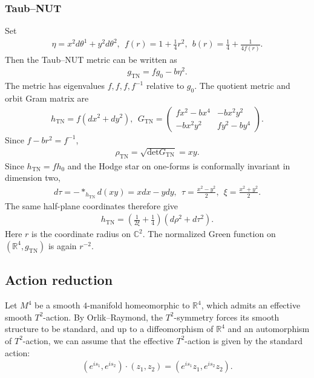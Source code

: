 \documentclass[letterpaper]{amsart}
\theoremstyle{definition}
\theoremstyle{remark}
\begin{document}
\subsubsection{Taub--NUT}
Set
\begin{align*}
	\eta = x ^2 d \theta ^{1} + y ^2 d \theta ^2,\ \ f(r)= 1+ \frac{1}{4}r ^2,\ \ b(r) = \frac{1}{4}+ \frac{1}{4 f(r)}.
\end{align*} 
Then the Taub--NUT metric can be written as
\begin{align*}
	g_{\mathrm{TN}} = f g_0 - b \eta ^2.
\end{align*} 
The metric has eigenvalues $f, f, f, f ^{-1}$ relative to $g_0$. The quotient metric and orbit Gram matrix are
\begin{align*}
	h_{\mathrm{TN}} = f (d x ^2 + d y ^2) ,\ \ G_{\mathrm{TN}} = \begin{pmatrix} f x ^2- b x ^{4} & -b x ^2 y ^2 \\ - b x ^2 y ^2 & f y ^2 - b y ^{4} \end{pmatrix} .
\end{align*} 
Since $f - b r ^2 = f ^{-1}$, 
\begin{align*}
	\rho _{\mathrm{TN}} = \sqrt{\mathrm{det} G_{\mathrm{TN}}} = xy.
\end{align*} 
Since $h_{\mathrm{TN}}=fh_0$ and the Hodge star on one-forms is conformally invariant in dimension two,
\begin{align*}
	d \tau = - * _{h_{\mathrm{TN}}} d (x y) = x d x - y d y,\ \ \tau = \frac{x ^2 - y ^2}{2},\ \ \xi = \frac{x ^2+ y ^2}{2}.
\end{align*} 
The same half-plane coordinates therefore give
\begin{align*}
	h_{\mathrm{TN}} = \left( \frac{1}{2 \xi }+ \frac{1}{4} \right) (d \rho ^2+ d \tau ^2).
\end{align*} 
Here $r$ is the coordinate radius on $\mathbb C^2$. The normalized Green function on $(\mathbb R^4,g_{\mathrm{TN}})$ is again $r^{-2}$.

\subsection{Action reduction}
Let $M^4$ be a smooth $4$-manifold homeomorphic to $\mathbb{R}^{4}$, which admits an effective smooth $T^2$-action.
By Orlik--Raymond, the $T^2$-symmetry forces its smooth structure to be standard, and up to a diffeomorphism of $\mathbb{R}^{4}$ and an automorphism of $T^2$-action, we can assume that the effective $T^2$-action
is given by the standard action:
\begin{align*}
	\left( e ^{i s_1}, e ^{i s_2}\right) \cdot (z_1, z_2) = (e ^{i s_1} z_1, e ^{i s_2} z_2).
\end{align*} 
\end{document}
